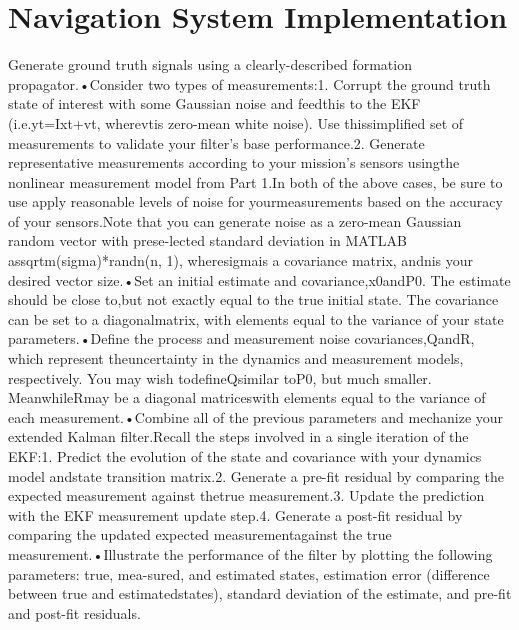 \documentclass[11pt,letterpaper]{article}
\begin{document}
\section{Navigation System Implementation}
Generate ground truth signals using a clearly-described formation propagator.•Consider two types of measurements:1.  Corrupt  the  ground  truth  state  of  interest  with  some  Gaussian  noise  and  feedthis to the EKF (i.e.yt=Ixt+vt, wherevtis zero-mean white noise).  Use thissimplified set of measurements to validate your filter’s base performance.2.  Generate representative measurements according to your mission’s sensors usingthe nonlinear measurement model from Part 1.In  both  of  the  above  cases,  be  sure  to  use  apply  reasonable  levels  of  noise  for  yourmeasurements based on the accuracy of your sensors.Note that you can generate noise as a zero-mean Gaussian random vector with prese-lected standard deviation in MATLAB assqrtm(sigma)*randn(n, 1), wheresigmais a covariance matrix, andnis your desired vector size.•Set an initial estimate and covariance,x0andP0.  The estimate should be close to,but not exactly equal to the true initial state.  The covariance can be set to a diagonalmatrix, with elements equal to the variance of your state parameters.•Define the process and measurement noise covariances,QandR, which represent theuncertainty in the dynamics and measurement models, respectively.  You may wish todefineQsimilar toP0, but much smaller.  MeanwhileRmay be a diagonal matriceswith elements equal to the variance of each measurement.•Combine all of the previous parameters and mechanize your extended Kalman filter.Recall the steps involved in a single iteration of the EKF:1.  Predict the evolution of the state and covariance with your dynamics model andstate transition matrix.2.  Generate a pre-fit residual by comparing the expected measurement against thetrue measurement.3.  Update the prediction with the EKF measurement update step.4.  Generate  a  post-fit  residual  by  comparing  the  updated  expected  measurementagainst the true measurement.•Illustrate the performance of the filter by plotting the following parameters: true, mea-sured, and estimated states, estimation error (difference between true and estimatedstates), standard deviation of the estimate, and pre-fit and post-fit residuals.
\end{document}
